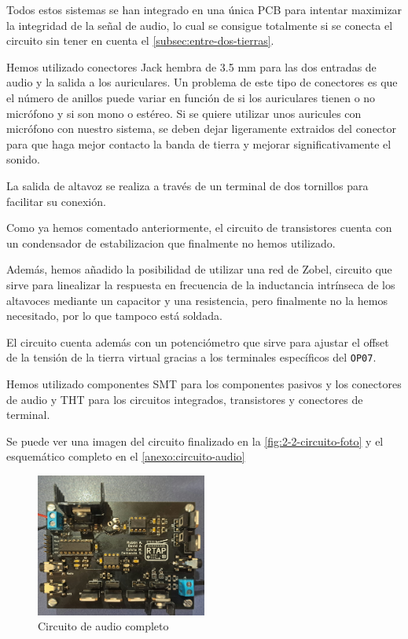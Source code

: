Todos estos sistemas se han integrado en una única PCB para intentar maximizar la integridad de la señal de audio, lo cual se consigue totalmente si se conecta el circuito sin tener en cuenta el \autoref{subsec:entre-dos-tierras}.

Hemos utilizado conectores Jack hembra de 3.5 mm para las dos entradas de audio y la salida a los auriculares. Un problema de este tipo de conectores es que el número de anillos puede variar en función de si los auriculares tienen o no micrófono y si son mono o estéreo. Si se quiere utilizar unos auricules con micrófono con nuestro sistema, se deben dejar ligeramente extraidos del conector para que haga mejor contacto la banda de tierra y mejorar significativamente el sonido.

La salida de altavoz se realiza a través de un terminal de dos tornillos para facilitar su conexión.

Como ya hemos comentado anteriormente, el circuito de transistores cuenta con un condensador de estabilizacion que finalmente no hemos utilizado. 

Además, hemos añadido la posibilidad de utilizar una red de Zobel, circuito que sirve para linealizar la respuesta en frecuencia de la inductancia intrínseca de los altavoces mediante un capacitor y una resistencia, pero finalmente no la hemos necesitado, por lo que tampoco está soldada.

El circuito cuenta además con un potenciómetro que sirve para ajustar el offset de la tensión de la tierra virtual gracias a los terminales específicos del \texttt{OP07}.

Hemos utilizado componentes SMT para los componentes pasivos y los conectores de audio y THT para los circuitos integrados, transistores y conectores de terminal.

Se puede ver una imagen del circuito finalizado en la \autoref{fig:2-2-circuito-foto} y el esquemático completo en el \autoref{anexo:circuito-audio}

\begin{figure}[h]
    \centering
    \includegraphics[width=0.5\textwidth]{images/2/2-2/circuito-foto.jpg}
    \caption{Circuito de audio completo}
    \label{fig:2-2-circuito-foto}
\end{figure}